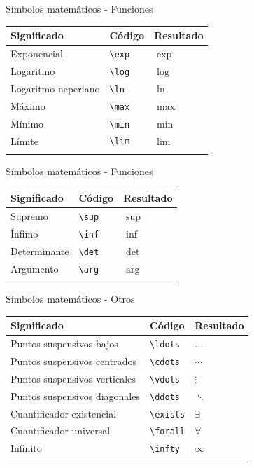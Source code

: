 \documentclass[
  ignorenonframetext,
  aspectratio=169]{beamer}
\begin{document}
\begin{frame}[fragile]{Símbolos matemáticos - Funciones}
\label{suxedmbolos-matemuxe1ticos---funciones-1}
\begin{longtable}[]{@{}lll@{}}
\toprule\noalign{}
Significado & Código & Resultado \\
\midrule\noalign{}
\endhead
Exponencial & \texttt{\textbackslash{}exp} & \(\exp\) \\
Logaritmo & \texttt{\textbackslash{}log} & \(\log\) \\
Logaritmo neperiano & \texttt{\textbackslash{}ln} & \(\ln\) \\
Máximo & \texttt{\textbackslash{}max} & \(\max\) \\
Mínimo & \texttt{\textbackslash{}min} & \(\min\) \\
Límite & \texttt{\textbackslash{}lim} & \(\lim\) \\
\bottomrule\noalign{}
\end{longtable}
\end{frame}

\begin{frame}[fragile]{Símbolos matemáticos - Funciones}
\label{suxedmbolos-matemuxe1ticos---funciones-2}
\begin{longtable}[]{@{}lll@{}}
\toprule\noalign{}
Significado & Código & Resultado \\
\midrule\noalign{}
\endhead
Supremo & \texttt{\textbackslash{}sup} & \(\sup\) \\
Ínfimo & \texttt{\textbackslash{}inf} & \(\inf\) \\
Determinante & \texttt{\textbackslash{}det} & \(\det\) \\
Argumento & \texttt{\textbackslash{}arg} & \(\arg\) \\
\bottomrule\noalign{}
\end{longtable}
\end{frame}

\begin{frame}[fragile]{Símbolos matemáticos - Otros}
\label{suxedmbolos-matemuxe1ticos---otros}
\begin{longtable}[]{@{}lll@{}}
\toprule\noalign{}
Significado & Código & Resultado \\
\midrule\noalign{}
\endhead
Puntos suspensivos bajos & \texttt{\textbackslash{}ldots} &
\(\ldots\) \\
Puntos suspensivos centrados & \texttt{\textbackslash{}cdots} &
\(\cdots\) \\
Puntos suspensivos verticales & \texttt{\textbackslash{}vdots} &
\(\vdots\) \\
Puntos suspensivos diagonales & \texttt{\textbackslash{}ddots} &
\(\ddots\) \\
Cuantificador existencial & \texttt{\textbackslash{}exists} &
\(\exists\) \\
Cuantificador universal & \texttt{\textbackslash{}forall} &
\(\forall\) \\
Infinito & \texttt{\textbackslash{}infty} & \(\infty\) \\
\bottomrule\noalign{}
\end{longtable}
\end{frame}
\end{document}
